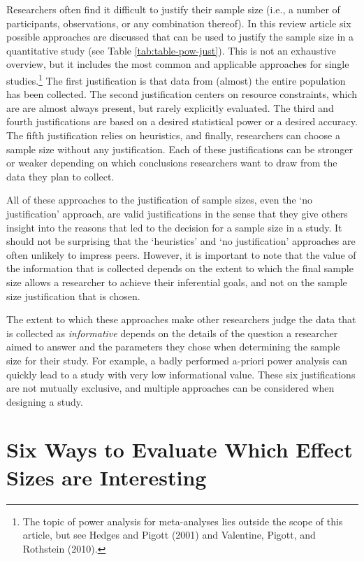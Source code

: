 \documentclass[
  english,
  ,jou, a4paper,floatsintext]{apa6}
\begin{document}
Researchers often find it difficult to justify their sample size (i.e., a number of participants, observations, or any combination thereof). In this review article six possible approaches are discussed that can be used to justify the sample size in a quantitative study (see Table \ref{tab:table-pow-just}). This is not an exhaustive overview, but it includes the most common and applicable approaches for single studies.\footnote{The topic of power analysis for meta-analyses lies outside the scope of this article, but see Hedges and Pigott (2001) and Valentine, Pigott, and Rothstein (2010).} The first justification is that data from (almost) the entire population has been collected. The second justification centers on resource constraints, which are are almost always present, but rarely explicitly evaluated. The third and fourth justifications are based on a desired statistical power or a desired accuracy. The fifth justification relies on heuristics, and finally, researchers can choose a sample size without any justification. Each of these justifications can be stronger or weaker depending on which conclusions researchers want to draw from the data they plan to collect.

All of these approaches to the justification of sample sizes, even the `no justification' approach, are valid justifications in the sense that they give others insight into the reasons that led to the decision for a sample size in a study. It should not be surprising that the `heuristics' and `no justification' approaches are often unlikely to impress peers. However, it is important to note that the value of the information that is collected depends on the extent to which the final sample size allows a researcher to achieve their inferential goals, and not on the sample size justification that is chosen.

The extent to which these approaches make other researchers judge the data that is collected as \emph{informative} depends on the details of the question a researcher aimed to answer and the parameters they chose when determining the sample size for their study. For example, a badly performed a-priori power analysis can quickly lead to a study with very low informational value. These six justifications are not mutually exclusive, and multiple approaches can be considered when designing a study.

\hypertarget{six-ways-to-evaluate-which-effect-sizes-are-interesting}{%
\section{Six Ways to Evaluate Which Effect Sizes are Interesting}\label{six-ways-to-evaluate-which-effect-sizes-are-interesting}}
\end{document}

